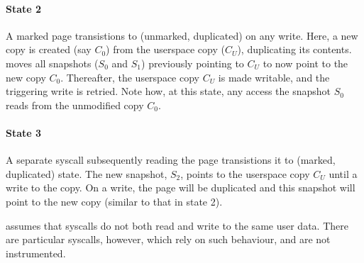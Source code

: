 \documentclass[letterpaper,twocolumn,10pt, anonymous]{article}
\begin{document}
\paragraph{State 2}
A marked page transistions to (unmarked, duplicated) on any write.
Here, a new copy is created (say $C_0$) from the userspace
copy ($C_U$), duplicating its contents.
\tiktok moves all snapshots ($S_0$ and $S_1$) previously 
pointing to $C_U$ to now point to the new copy $C_0$. 
Thereafter, the userspace copy $C_U$ is made writable, and the 
triggering write is retried. 
Note how, at this state, any access the snapshot $S_0$ reads from
the unmodified copy $C_0$.

\paragraph{State 3}
A separate syscall subsequently reading the page transistions 
it to (marked, duplicated) state. 
The new snapshot, $S_2$, points to the userspace copy $C_U$ 
until a write to the copy.
On a write, the page will be duplicated and this snapshot 
will point to the new copy (similar to that in state 2).





\tiktok assumes that syscalls do not both read and write to the same user data. 
There are particular syscalls, however, which rely on such behaviour, and 
are not instrumented.




\end{document}
